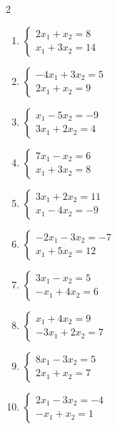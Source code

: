\begin{multicols}{2}
\begin{enumerate}[label=\arabic*., leftmargin=*]
\item $\begin{cases}2x_1+x_2=8\\x_1+3x_2=14\end{cases}$

\item $\begin{cases}-4x_1+3x_2=5\\2x_1+x_2=9\end{cases}$

\item $\begin{cases}x_1-5x_2=-9\\3x_1+2x_2=4\end{cases}$

\item $\begin{cases}7x_1-x_2=6\\x_1+3x_2=8\end{cases}$

\item $\begin{cases}3x_1+2x_2=11\\x_1-4x_2=-9\end{cases}$

\item $\begin{cases}-2x_1-3x_2=-7\\x_1+5x_2=12\end{cases}$

\item $\begin{cases}3x_1-x_2=5\\-x_1+4x_2=6\end{cases}$

\item $\begin{cases}x_1+4x_2=9\\-3x_1+2x_2=7\end{cases}$

\item $\begin{cases}8x_1-3x_2=5\\2x_1+x_2=7\end{cases}$

\item $\begin{cases}2x_1-3x_2=-4\\-x_1+x_2=1\end{cases}$

\end{enumerate}
\end{multicols}

